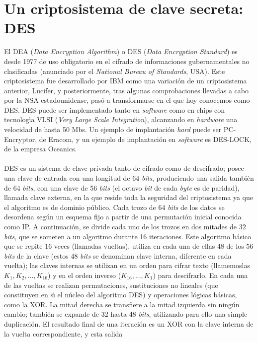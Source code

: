 \section{Un criptosistema de clave secreta: DES}
El DEA ({\it Data Encryption Algorithm}) o DES ({\it Data Encryption Standard})
es desde 1977 de uso obligatorio en el cifrado de informaciones gubernamentales
no clasificadas (anunciado por el {\it National Bureau of Standards}, USA). Este
criptosistema fue desarrollado por IBM como una variaci\'on
de un criptosistema anterior, Lucifer, y posteriormente, tras algunas 
comprobaciones llevadas a cabo por la NSA estadounidense, pas\'o
a transformarse en el que hoy conocemos como DES. DES puede ser implementado 
tanto en {\it software} como en chips con tecnolog\'{\i}a VLSI ({\it Very Large 
Scale Integration}), alcanzando en {\it hardware} una velocidad
de hasta 50 Mbs. Un ejemplo de implantaci\'on {\it hard} puede ser PC-Encryptor,
de Eracom, y un ejemplo de implantaci\'on en {\it software} es DES-LOCK,
de la empresa Oceanics.\\
\\DES es un sistema de clave privada tanto de cifrado como de descifrado;
posee una clave de entrada con una longitud de 64 {\it bits}, produciendo una
salida tambi\'en de 64 {\it bits}, con una clave de 56 {\it bits} (el octavo 
{\it bit} de cada {\it byte} es de paridad), llamada clave externa, en la que 
reside toda
la seguridad del criptosistema ya que el algoritmo es de dominio p\'ublico.
Cada trozo de 64 {\it bits} de los datos se desordena seg\'un un esquema
fijo a partir de una permutaci\'on inicial conocida como IP. A continuaci\'on,
se divide cada uno de los trozos en dos mitades de 32 {\it bits}, que se someten
a un algoritmo durante 16 iteraciones. Este algoritmo b\'asico que
se repite 16 veces (llamadas vueltas), utiliza en cada una de ellas 48 de los 
56 {\it bits} de la clave (estos 48 {\it bits} se denominan clave interna, 
diferente en cada vuelta); las claves internas se utilizan en un orden para 
cifrar texto (lla\-me\-mos\-las $K_{1}, K_{2},...,K_{16}$) y en el orden 
inverso ($K_{16},..., K_{1}$)
para descifrarlo. En cada una de las vueltas se realizan permutaciones,
sustituciones no lineales (que constituyen en s\'{\i} el n\'ucleo
del algoritmo DES) y operaciones l\'ogicas b\'asicas, como la
XOR. La mitad derecha se transfiere a la mitad izquierda sin ning\'un
cambio; tambi\'en se expande de 32 hasta 48 {\it bits}, utilizando para
ello una simple duplicaci\'on. El resultado final de una iteraci\'on
es un XOR con la clave interna de la vuelta correspondiente, y esta salida
